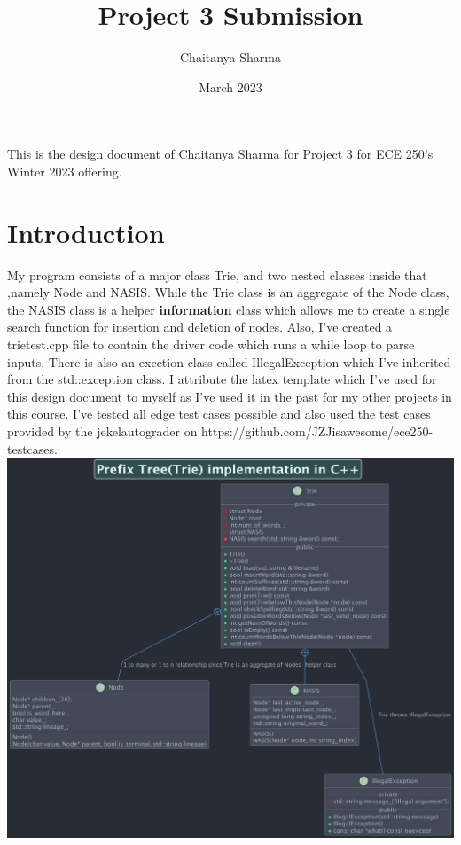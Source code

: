 \documentclass[a4paper]{article}
\title{Project 3 Submission}
\author{Chaitanya Sharma}
\date{March 2023}
\makeatletter
\renewenvironment{abstract}{%
    \if@twocolumn
      \section*{\abstractname}%
    \else 
      \begin{center}%
        {\bfseries \Large\abstractname\vspace{\z@}}
      \end{center}%
      \quotation
    \fi}
    {\if@twocolumn\else\endquotation\fi}
\makeatother
\begin{document}
\begin{center}
	\begin{abstract}
		This is the design document of Chaitanya Sharma for Project 3 for ECE 250's Winter 2023 offering.
	\end{abstract}
\end{center}

\section{Introduction}
My program consists of a major class {\color{draculapurple}Trie}, and two nested classes inside that ,namely {\color{draculapurple}Node} and
	{\color{draculapurple}NASIS}.
	While the {\color{draculapurple}Trie} class is an aggregate of the {\color{draculapurple}Node} class, the {\color{draculapurple}NASIS} class is a helper {\textbf{information}} class which allows me to create a single search function for insertion and deletion of nodes.
Also, I've created a {\color{draculayellow}trietest.cpp} file to contain the driver code which runs a while loop to parse inputs. There is also an excetion class called {\color{draculapurple}IllegalException} which I've inherited from the {\color{draculapurple}std::exception} class.
I attribute the latex template which I've used for this design document to myself as I've used it in the past for my other projects in this course.
\newline I've tested all edge test cases possible and also used the test cases provided by the
jekelautograder on {\color{DarkPastelBlue}https://github.com/JZJisawesome/ece250-testcases}.
\newline
\includegraphics[scale=0.145, center]{PrefixTrie.png}
\end{document}
